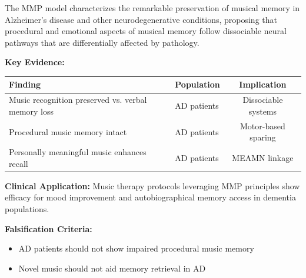 \documentclass[9pt,onecolumn]{article}
\begin{document}
The MMP model characterizes the remarkable preservation of musical memory in Alzheimer's disease and other neurodegenerative conditions, proposing that procedural and emotional aspects of musical memory follow dissociable neural pathways that are differentially affected by pathology.

\textbf{Key Evidence:}
\begin{center}
\small
\begin{tabular}{@{}llc@{}}
\toprule
\textbf{Finding} & \textbf{Population} & \textbf{Implication} \\
\midrule
Music recognition preserved vs. verbal memory loss & AD patients & Dissociable systems \\
Procedural music memory intact & AD patients & Motor-based sparing \\
Personally meaningful music enhances recall & AD patients & MEAMN linkage \\
\bottomrule
\end{tabular}
\end{center}

\textbf{Clinical Application:} Music therapy protocols leveraging MMP principles show efficacy for mood improvement and autobiographical memory access in dementia populations.

\textbf{Falsification Criteria:}
\begin{itemize}[leftmargin=*, topsep=0pt, itemsep=0pt]
\item AD patients should not show impaired procedural music memory
\item Novel music should not aid memory retrieval in AD
\end{itemize}
\end{document}
